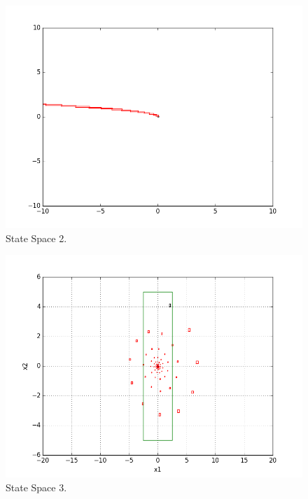 \begin{figure}
    \includegraphics[width=\linewidth]{2}
    \caption{State Space 2.}
    \label{fig:2}
\end{figure}


\begin{figure}
    \includegraphics[width=\linewidth]{3}
    \caption{State Space 3.}
    \label{fig:3}
\end{figure}


